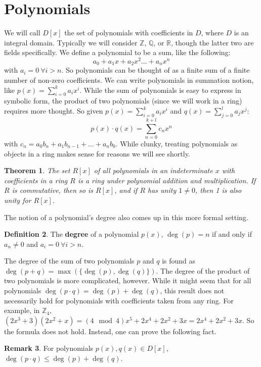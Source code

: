 \documentclass[11pt]{amsart}
\newtheorem{theorem}{Theorem}[section]
\theoremstyle{definition}
\newtheorem{definition}[theorem]{Definition}
\newtheorem{remark}[theorem]{Remark}
\newcommand{\reals}{\mathbb{R}}
\newcommand{\rationals}{\mathbb{Q}}
\newcommand{\integers}{\mathbb{Z}}
\begin{document}
\section{Polynomials}
We will call $D[x]$ the set of polynomials with coefficients in $D$, where $D$ is an integral domain. Typically we will consider $\integers$, 
$\rationals$, or $\reals$, though the latter two are fields specifically. We define a polynomial to be a sum, like the following:
\[
	a_0 + a_1 x + a_2 x^2 \dots + a_n x^n
\]
with $a_i = 0 \: \forall i > n$. So polynomials can be thought of as a finite sum of a finite number of non-zero coefficients. We can write
polynomials in summation notion, like $p(x) = \sum_{i = 0}^{k}{a_i x^i}$. While the sum of polynomials is easy to express in symbolic form, the
product of two polynomials (since we will work in a ring) requires more thought. So given $p(x) = \sum_{i = 0}^{k}{a_i x^i}$ and 
$q(x) = \sum_{j = 0}^{l}{a_j x^j}$:
\[
	p(x) \cdot q(x) = \sum_{n = 0}^{k + l}{c_n x^n}
\]
with $c_n = a_0 b_n + a_1 b_{n-1} + \dots + a_n b_0$. While clunky, treating polynomials as objects in a ring makes sense for reasons we will
see shortly.
\begin{theorem}
	The set $R[x]$ of all polynomials in an indeterminate $x$ with coefficients in a ring $R$ is a ring under polynomial addition and
	multiplication. If $R$ is commutative, then so is $R[x]$, and if $R$ has unity $1 \neq 0$, then 1 is also unity for $R[x]$.
\end{theorem}
The notion of a polynomial's degree also comes up in this more formal setting.
\begin{definition}
	The \textbf{degree} of a polynomial $p(x)$, $\deg(p) = n$ if and only if $a_n \neq 0$ and $a_i = 0 \: \forall i > n$.
\end{definition}
The degree of the sum of two polynomials $p$ and $q$ is found as $\deg(p + q) = \max(\{ \deg(p), \deg(q) \} )$. The degree of the product of two
polynomials is more complicated, however. While it might seem that for all polynomials $\deg(p \cdot q) = \deg(p) + \deg(q)$, this result does not
necessarily hold for polynomials with coefficients taken from any ring. For example, in 
$\integers_{4}$, $(2x^3 + 3)(2x^2 + x) = (4 \mod 4)x^5 + 2x^4 + 2x^2 + 3x = 2x^4 + 2x^2 + 3x$. So the formula does not hold. Instead, one can
prove the following fact.
\begin{remark}
	For polynomials $p(x), q(x) \in D[x]$, $\deg(p \cdot q) \leq \deg(p) + \deg(q)$.
\end{remark}
\end{document}
